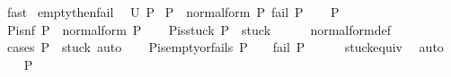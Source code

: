 \begin{isabellebody}
\ fast%
\endisatagproof
{\isafoldproof}%
%
\isadelimproof
\isanewline
%
\endisadelimproof
\isanewline
\isanewline
\isanewline
\isanewline
{}\isamarkupfalse%
\ empty{\isacharunderscore}{\kern0pt}then{\isacharunderscore}{\kern0pt}fail{\isacharcolon}{\kern0pt}\ \isanewline
{}\ {\isachardoublequoteopen}U\ P{}{\isacharequal}{\kern0pt}{\isacharbraceleft}{\kern0pt}{\isacharbraceright}{\kern0pt}{\isachardoublequoteclose}\isanewline
{}\ {\isacharparenleft}{\kern0pt}{\isasymforall}P\ {\isasymin}\ normal{\isacharunderscore}{\kern0pt}form\ P{}{\isachardot}{\kern0pt}\ fail\ P{\isacharparenright}{\kern0pt}{\isachardoublequoteclose}\isanewline
%
\isadelimproof
%
\endisadelimproof
%
\isatagproof
{}\isamarkupfalse%
\isanewline
\ \ \isamarkupfalse%
\ P\isanewline
\ \ \isamarkupfalse%
\ P{\isacharunderscore}{\kern0pt}is{\isacharunderscore}{\kern0pt}nf{\isacharcolon}{\kern0pt}\ {\isachardoublequoteopen}P\ {\isasymin}\ normal{\isacharunderscore}{\kern0pt}form\ P{}{\isachardoublequoteclose}\isanewline
\ \ \isamarkupfalse%
\ P{\isacharunderscore}{\kern0pt}is{\isacharunderscore}{\kern0pt}stuck{\isacharcolon}{\kern0pt}\ {\isachardoublequoteopen}P\ {\isasymin}\ stuck{\isachardoublequoteclose}\isanewline
\ \ \ \ \isamarkupfalse%
\ normal{\isacharunderscore}{\kern0pt}form{\isacharunderscore}{\kern0pt}def\ \isamarkupfalse%
\ {\isacharparenleft}{\kern0pt}cases\ {\isachardoublequoteopen}P{}\ {\isasymin}\ stuck{\isachardoublequoteclose}{\isacharparenright}{\kern0pt}\ auto\isanewline
\ \ \isamarkupfalse%
\ P{\isacharunderscore}{\kern0pt}is{\isacharunderscore}{\kern0pt}empty{\isacharunderscore}{\kern0pt}or{\isacharunderscore}{\kern0pt}fails{\isacharcolon}{\kern0pt}\ {\isachardoublequoteopen}P\ {\isacharequal}{\kern0pt}\ {\isacharparenleft}{\kern0pt}{\isacharbrackleft}{\kern0pt}{\isacharbrackright}{\kern0pt}{\isacharcomma}{\kern0pt}{\isacharbrackleft}{\kern0pt}{\isacharbrackright}{\kern0pt}{\isacharparenright}{\kern0pt}\ {\isasymor}\ fail\ P{\isachardoublequoteclose}\isanewline
\ \ \ \ \isamarkupfalse%
\ stuck{\isacharunderscore}{\kern0pt}equiv\ \isamarkupfalse%
\ auto\isanewline
\ \ \isamarkupfalse%
\ {\isachardoublequoteopen}P\ {\isasymnoteq}\ {\isacharparenleft}{\kern0pt}{\isacharbrackleft}{\kern0pt}{\isacharbrackright}{\kern0pt}{\isacharcomma}{\kern0pt}{\isacharbrackleft}{\kern0pt}{\isacharbrackright}{\kern0pt}{\isacharparenright}{\kern0pt}{\isachardoublequoteclose}\isanewline

\end{isabellebody}
